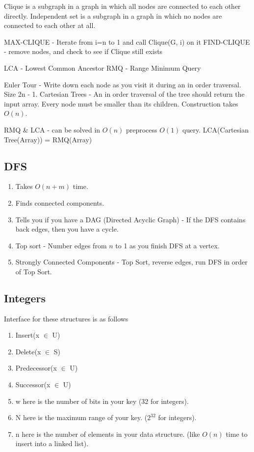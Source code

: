 \documentclass[12pt,twocolumn]{article}
\begin{document}
Clique is a subgraph in a graph in which all nodes are connected to each other directly.
Independent set is a subgraph in a graph in which no nodes are connected to each other at all.

MAX-CLIQUE - Iterate from i=n to 1 and call Clique(G, i) on it
FIND-CLIQUE - remove nodes, and check to see if Clique still exists

LCA - Lowest Common Ancestor
RMQ - Range Minimum Query

Euler Tour - Write down each node as you visit it during an in order traversal. Size 2n - 1.
Cartesian Trees - An in order traversal of the tree should return the input array. Every node must be smaller than its children. Construction takes $O(n)$.

RMQ \& LCA - can be solved in $O(n)$ preprocess $O(1)$ query. LCA(Cartesian Tree(Array)) = RMQ(Array)

\subsection{DFS}
\begin{enumerate}
    \item Takes $O(n+m)$ time.
    \item Finds connected components.
    \item Tells you if you have a DAG (Directed Acyclic Graph) - If the DFS contains back edges, then you have a cycle.
    \item Top sort - Number edges from $n$ to 1 as you finish DFS at a vertex.
    \item Strongly Connected Components - Top Sort, reverse edges, run DFS in order of Top Sort.
\end{enumerate}

\subsection{Integers}

Interface for these structures is as follows
\begin{enumerate}
    \item Insert(x $\in$ U)
    \item Delete(x $\in$ S)
    \item Predecessor(x $\in$ U)
    \item Successor(x $\in$ U)
    \item w here is the number of bits in your key (32 for integers).
    \item N here is the maximum range of your key. ($2^{32}$ for integers).
    \item n here is the number of elements in your data structure. (like $O(n)$ time to insert into a linked list).
\end{enumerate}
\end{document}
